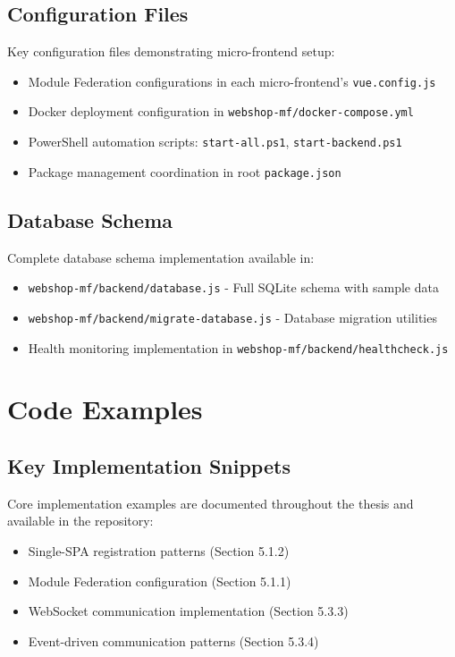 \documentclass[12pt,a4paper]{report}
\begin{document}
\section{Configuration Files}
Key configuration files demonstrating micro-frontend setup:
\begin{itemize}
\item Module Federation configurations in each micro-frontend's \texttt{vue.config.js}
\item Docker deployment configuration in \texttt{webshop-mf/docker-compose.yml}
\item PowerShell automation scripts: \texttt{start-all.ps1}, \texttt{start-backend.ps1}
\item Package management coordination in root \texttt{package.json}
\end{itemize}

\section{Database Schema}
Complete database schema implementation available in:
\begin{itemize}
\item \texttt{webshop-mf/backend/database.js} - Full SQLite schema with sample data
\item \texttt{webshop-mf/backend/migrate-database.js} - Database migration utilities
\item Health monitoring implementation in \texttt{webshop-mf/backend/healthcheck.js}
\end{itemize}

\chapter{Code Examples}
\section{Key Implementation Snippets}
Core implementation examples are documented throughout the thesis and available in the repository:
\begin{itemize}
\item Single-SPA registration patterns (Section 5.1.2)
\item Module Federation configuration (Section 5.1.1) 
\item WebSocket communication implementation (Section 5.3.3)
\item Event-driven communication patterns (Section 5.3.4)
\end{itemize}
\end{document}
